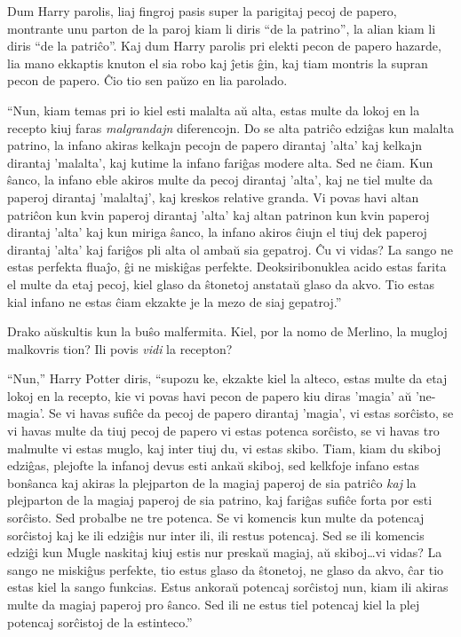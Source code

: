 Dum Harry parolis, liaj fingroj pasis super la parigitaj pecoj de
papero, montrante unu parton de la paroj kiam li diris ``de la
patrino'', la alian kiam li diris ``de la patriĉo''. Kaj dum Harry
parolis pri elekti pecon de papero hazarde, lia mano ekkaptis knuton
el sia robo kaj ĵetis ĝin, kaj tiam montris la supran pecon de
papero. Ĉio tio sen paŭzo en lia parolado.

``Nun, kiam temas pri io kiel esti malalta aŭ alta, estas multe da
lokoj en la recepto kiuj faras \emph{malgrandajn} diferencojn. Do se
alta patriĉo edziĝas kun malalta patrino, la infano akiras kelkajn
pecojn de papero dirantaj 'alta' kaj kelkajn dirantaj 'malalta', kaj
kutime la infano fariĝas modere alta. Sed ne ĉiam. Kun ŝanco, la
infano eble akiros multe da pecoj dirantaj 'alta', kaj ne tiel multe
da paperoj dirantaj 'malaltaj', kaj kreskos relative granda. Vi povas
havi altan patriĉon kun kvin paperoj dirantaj 'alta' kaj altan
patrinon kun kvin paperoj dirantaj 'alta' kaj kun miriga ŝanco, la
infano akiros ĉiujn el tiuj dek paperoj dirantaj 'alta' kaj fariĝos
pli alta ol ambaŭ sia gepatroj. Ĉu vi vidas? La sango ne estas
perfekta fluaĵo, ĝi ne miskiĝas perfekte. Deoksiribonuklea acido estas
farita el multe da etaj pecoj, kiel glaso da ŝtonetoj anstataŭ glaso
da akvo. Tio estas kial infano ne estas ĉiam ekzakte je la mezo de
siaj gepatroj.''

Drako aŭskultis kun la buŝo malfermita. Kiel, por la nomo de Merlino, la mugloj malkovris tion? Ili povis \emph{vidi} la recepton?

``Nun,'' Harry Potter diris, ``supozu ke, ekzakte kiel la alteco,
estas multe da etaj lokoj en la recepto, kie vi povas havi pecon de
papero kiu diras 'magia' aŭ 'ne-magia'. Se vi havas sufiĉe da pecoj de
papero dirantaj 'magia', vi estas sorĉisto, se vi havas multe da tiuj
pecoj de papero vi estas potenca sorĉisto, se vi havas tro malmulte vi
estas muglo, kaj inter tiuj du, vi estas skibo. Tiam, kiam du skiboj edziĝas,
plejofte la infanoj devus esti ankaŭ skiboj, sed kelkfoje infano estas
bonŝanca kaj akiras la plejparton de la magiaj paperoj de sia patriĉo
\emph{kaj} la plejparton de la magiaj paperoj de sia patrino, kaj
fariĝas sufiĉe forta por esti sorĉisto. Sed probalbe ne tre
potenca. Se vi komencis kun multe da potencaj sorĉistoj kaj ke ili
edziĝis nur inter ili, ili restus potencaj. Sed se ili komencis edziĝi kun
Mugle naskitaj kiuj estis nur preskaŭ magiaj, aŭ skiboj\ldots{}vi
vidas? La sango ne miskiĝus perfekte, tio estus glaso da ŝtonetoj, ne
glaso da akvo, ĉar tio estas kiel la sango funkcias. Estus ankoraŭ
potencaj sorĉistoj nun, kiam ili akiras multe da magiaj paperoj pro
ŝanco. Sed ili ne estus tiel potencaj kiel la plej potencaj sorĉistoj
de la estinteco.''

